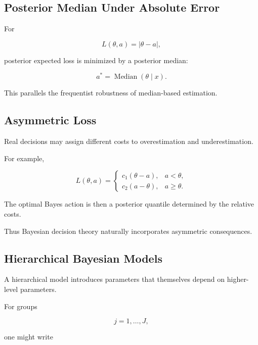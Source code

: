 \subsection{Posterior Median Under Absolute Error}
\label{subsec:posterior-median-absolute-error}

For

\[
L(\theta,a)
=
|\theta-a|,
\]

posterior expected loss is minimized by a posterior median:

\[
\boxed{
a^*
=
\operatorname{Median}(\theta\mid x).
}
\]

This parallels the frequentist robustness of median-based estimation.

\subsection{Asymmetric Loss}
\label{subsec:asymmetric-bayesian-loss}

Real decisions may assign different costs to overestimation and
underestimation.

For example,

\[
\boxed{
L(\theta,a)
=
\begin{cases}
c_1(\theta-a),&a<\theta,\\
c_2(a-\theta),&a\geq\theta.
\end{cases}
}
\]

The optimal Bayes action is then a posterior quantile determined by the
relative costs.

Thus Bayesian decision theory naturally incorporates asymmetric
consequences.

\subsection{Hierarchical Bayesian Models}
\label{subsec:hierarchical-bayesian-models}

A hierarchical model introduces parameters that themselves depend on
higher-level parameters.

For groups

\[
j=1,\ldots,J,
\]

one might write

